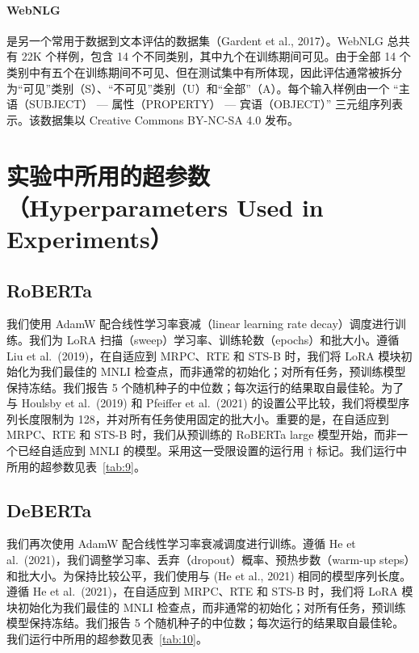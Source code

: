 \documentclass[11pt,UTF8,fontset=fandol]{ctexart}
\begin{document}
\paragraph{WebNLG}是另一个常用于数据到文本评估的数据集（Gardent et al., 2017）。WebNLG 总共有 22K 个样例，包含 14 个不同类别，其中九个在训练期间可见。由于全部 14 个类别中有五个在训练期间不可见、但在测试集中有所体现，因此评估通常被拆分为“可见”类别（S）、“不可见”类别（U）和“全部”（A）。每个输入样例由一个 “主语（SUBJECT） --- 属性（PROPERTY） --- 宾语（OBJECT）” 三元组序列表示。该数据集以 Creative Commons BY-NC-SA 4.0 发布。

\section{实验中所用的超参数（Hyperparameters Used in Experiments）}

\subsection{RoBERTa}

我们使用 AdamW 配合线性学习率衰减（linear learning rate decay）调度进行训练。我们为 LoRA 扫描（sweep）学习率、训练轮数（epochs）和批大小。遵循 Liu et al.\ (2019)，在自适应到 MRPC、RTE 和 STS-B 时，我们将 LoRA 模块初始化为我们最佳的 MNLI 检查点，而非通常的初始化；对所有任务，预训练模型保持冻结。我们报告 5 个随机种子的中位数；每次运行的结果取自最佳轮。为了与 Houlsby et al.\ (2019) 和 Pfeiffer et al.\ (2021) 的设置公平比较，我们将模型序列长度限制为 128，并对所有任务使用固定的批大小。重要的是，在自适应到 MRPC、RTE 和 STS-B 时，我们从预训练的 RoBERTa large 模型开始，而非一个已经自适应到 MNLI 的模型。采用这一受限设置的运行用 $\dagger$ 标记。我们运行中所用的超参数见表~\ref{tab:9}。

\subsection{DeBERTa}

我们再次使用 AdamW 配合线性学习率衰减调度进行训练。遵循 He et al.\ (2021)，我们调整学习率、丢弃（dropout）概率、预热步数（warm-up steps）和批大小。为保持比较公平，我们使用与 (He et al., 2021) 相同的模型序列长度。遵循 He et al.\ (2021)，在自适应到 MRPC、RTE 和 STS-B 时，我们将 LoRA 模块初始化为我们最佳的 MNLI 检查点，而非通常的初始化；对所有任务，预训练模型保持冻结。我们报告 5 个随机种子的中位数；每次运行的结果取自最佳轮。我们运行中所用的超参数见表~\ref{tab:10}。
\end{document}
